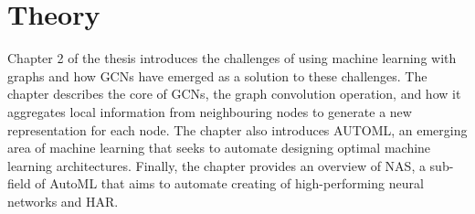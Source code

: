 \chapter{Theory}
\begin{comment}
This chapter will contain the essential theory for the thesis. 

As the authors did a literature review as a pre-study for this project, some subchapters will be re-used as the theory is still highly relevant for this thesis. 
\end{comment}
Chapter 2 of the thesis introduces the challenges of using machine learning with graphs and how GCNs have emerged as a solution to these challenges. The chapter describes the core of GCNs, the graph convolution operation, and how it aggregates local information from neighbouring nodes to generate a new representation for each node. The chapter also introduces \Gls{AUTOML}, an emerging area of machine learning that seeks to automate designing optimal machine learning architectures. Finally, the chapter provides an overview of NAS, a sub-field of AutoML that aims to automate creating of high-performing neural networks and HAR. 





 

